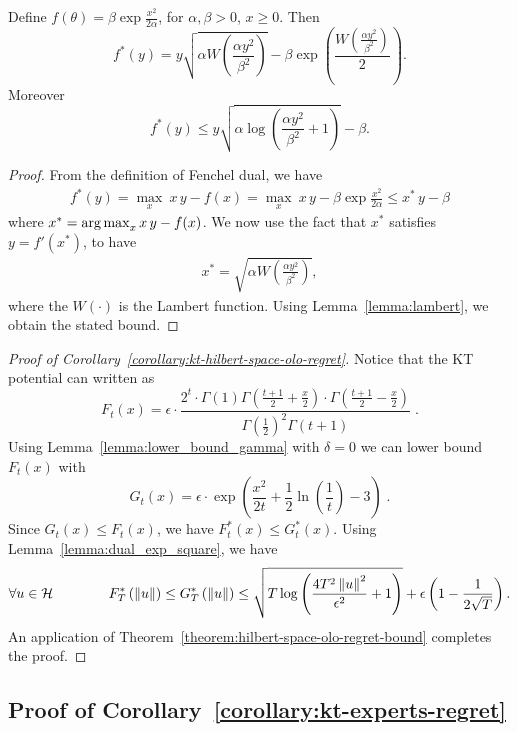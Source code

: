 \begin{lemma}
\label{lemma:dual_exp_square}
Define $f(\theta)= \beta \exp\frac{x^2}{2 \alpha}$, for $\alpha,\beta>0$, $x\geq0$. Then
\[
f^*(y)=y \sqrt{\alpha W\left(\frac{\alpha y^2}{\beta^2}\right)} - \beta \exp\left(\frac{W\left(\frac{\alpha y^2}{\beta^2}\right)}{2}\right).
\]
Moreover
\[
f^*(y) \leq y \sqrt{\alpha \log \left(\frac{\alpha y^2}{\beta^2} +1 \right)} - \beta.
\]
\end{lemma}
\begin{proof}
From the definition of Fenchel dual, we have
\begin{align*}
f^*(y)= \max_{x} \  x\, y - f(x) = \max_{x} \  x\, y - \beta \exp\frac{x^2}{2 \alpha} \leq x^*\,y -\beta
\end{align*}
where $x^*= \operatorname*{arg\,max}_{x} x\, y - f(x)$. We now use the fact that $x^*$ satisfies $y = f'(x^*)$, to have
\begin{align*}
x^*=\sqrt{\alpha W\left(\frac{\alpha y^2}{\beta^2}\right)},
\end{align*}
where the $W(\cdot)$ is the Lambert function.
Using Lemma~\ref{lemma:lambert}, we obtain the stated bound.
\end{proof}


\begin{proof}[Proof of Corollary~\ref{corollary:kt-hilbert-space-olo-regret}]
Notice that the KT potential can written as
$$
F_t(x) = \epsilon \cdot \frac{2^t \cdot \Gamma(1) \Gamma \left(\frac{t+1}{2} + \frac{x}{2} \right) \cdot \Gamma \left(\frac{t+1}{2} - \frac{x}{2} \right)}{ \Gamma(\frac{1}{2})^2 \Gamma(t+1)} \; .
$$
Using Lemma~\ref{lemma:lower_bound_gamma} with $\delta = 0$ we can lower bound $F_t(x)$ with
$$
G_t(x) = \epsilon \cdot \exp\left(\frac{x^2}{2t} + \frac{1}{2} \ln \left(\frac{1}{t} \right) -3 \right) \; .
$$
Since $G_t(x) \le F_t(x)$, we have $F^*_t(x) \le G_t^*(x)$. Using Lemma~\ref{lemma:dual_exp_square}, we have
\[
\forall u \in \mathcal{H} \qquad \qquad
F^*_T\left(\left\|{u}\right\|\right)
\le G^*_T\left(\left\|{u}\right\|\right)
\le \sqrt{T \log \left(\frac{4 T^2 \left\|{u}\right\|^2}{\epsilon^2} +1 \right)}+\epsilon\left(1-\frac{1}{2\sqrt{T}}\right).
\]
An application of Theorem~\ref{theorem:hilbert-space-olo-regret-bound} completes the proof.
\end{proof}

\subsection{Proof of Corollary~\ref{corollary:kt-experts-regret}}

